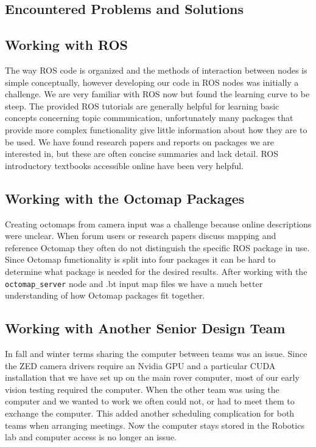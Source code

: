 \documentclass[10pt, oneside,onecolumn]{IEEEtran}
\begin{document}
\begin{titlepage}
\section{Encountered Problems and Solutions}
\subsection{Working with ROS}
The way ROS code is organized and the methods of interaction between nodes is simple conceptually, however developing our code in ROS nodes was initially a challenge. We are very familiar with ROS now but found the learning curve to be steep. The provided ROS tutorials are generally helpful for learning basic concepts concerning topic communication, unfortunately many packages that provide more complex functionality give little information about how they are to be used. We have found research papers and reports on packages we are interested in, but these are often concise summaries and lack detail. ROS introductory textbooks accessible online have been very helpful.

\subsection{Working with the Octomap Packages}
Creating octomaps from camera input was a challenge because online descriptions were unclear. When forum users or research papers discuss mapping and reference Octomap they often do not distinguish the specific ROS package in use. Since Octomap functionality is split into four packages it can be hard to determine what package is needed for the desired results. After working with the \texttt{octomap\_server} node and .bt input map files we have a much better understanding of how Octomap packages fit together. 

\subsection{Working with Another Senior Design Team}
In fall and winter terms sharing the computer between teams was an issue. Since the ZED camera drivers require an Nvidia GPU and a particular CUDA installation that we have set up on the main rover computer, most of our early vision testing required the computer. When the other team was using the computer and we wanted to work we often could not, or had to meet them to exchange the computer. This added another scheduling complication for both teams when arranging meetings. Now the computer stays stored in the Robotics lab and computer access is no longer an issue. 


\end{titlepage}
\end{document}
